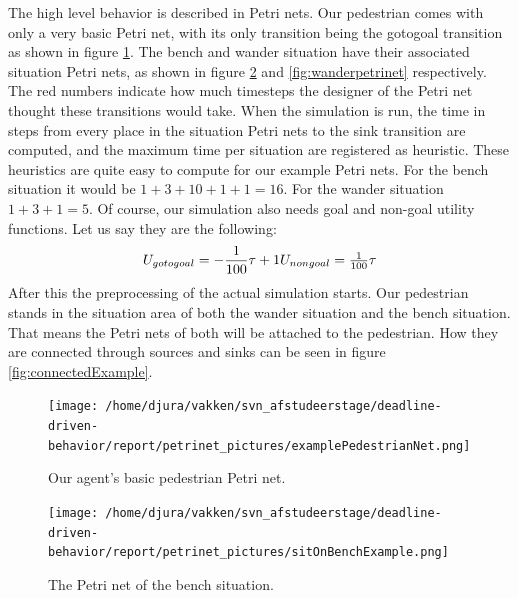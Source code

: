 \documentclass[11pt, a4paper]{book}
\begin{document}
The high level behavior is described in Petri nets. Our pedestrian comes with only a very basic Petri net, with its only transition being the gotogoal transition as shown in figure \ref{fig:exampleAgentnet}. The bench and wander situation have their associated situation Petri nets, as shown in figure \ref{fig:benchSituationNet} and \ref{fig:wanderpetrinet} respectively. 
The red numbers indicate how much timesteps the designer of the Petri net thought these transitions would take. When the simulation is run, the time in steps from every place in the situation Petri nets to the sink transition are computed, and the maximum time per situation are registered as heuristic. These heuristics are quite easy to compute for our example Petri nets. For the bench situation it would be $1+3+10+1+1 = 16$. For the wander situation $1+3+1=5$. Of course, our simulation also needs goal and non-goal utility functions. Let us say they are the following:
\begin{equation}
U_{gotogoal}=-\frac{1}{100}\tau + 1 $$\\$$
U_{nongoal}=\frac{1}{100} \tau 
\end{equation}
After this the preprocessing of the actual simulation starts. Our pedestrian stands in the situation area of both the wander situation and the bench situation. That means the Petri nets of both will be attached to the pedestrian. How they are connected through sources and sinks can be seen in figure \ref{fig:connectedExample}.



\begin{figure}[h!]
\centering            
\texttt{[image: /home/djura/vakken/svn\_afstudeerstage/deadline-driven-behavior/report/petrinet\_pictures/examplePedestrianNet.png]}
\caption{Our agent's basic pedestrian Petri net.}
\label{fig:exampleAgentnet}
\end{figure} 
\begin{figure}[h!]
\centering            
\texttt{[image: /home/djura/vakken/svn\_afstudeerstage/deadline-driven-behavior/report/petrinet\_pictures/sitOnBenchExample.png]}
\caption{The Petri net of the bench situation.}
\label{fig:benchSituationNet}
\end{figure} 
\end{document}
